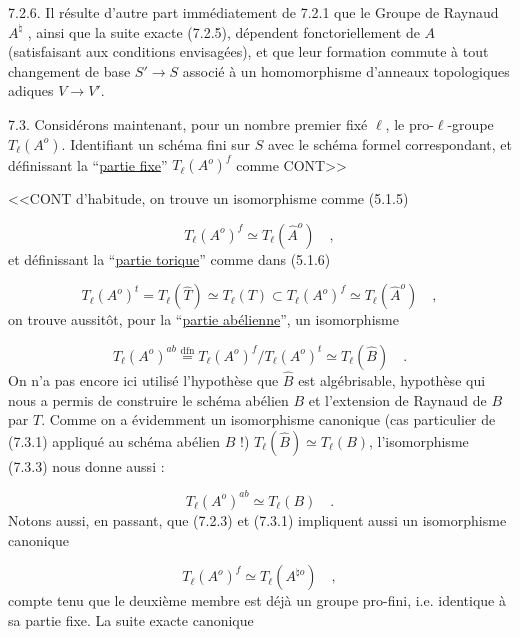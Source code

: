 7.2.6. Il résulte d'autre part immédiatement de 7.2.1 que le Groupe de Raynaud $A^{\natural}$ , ainsi que la suite exacte (7.2.5), dépendent fonctoriellement de $A$ (satisfaisant aux conditions envisagées), et que leur formation commute à tout changement de base $S' \longrightarrow S$ associé à un homomorphisme d'anneaux topologiques adiques $V \longrightarrow V'$.

7.3. Considérons maintenant, pour un nombre premier fixé $\ell$, le pro-$\ell$-groupe $T_{\ell}(A^{o})$. Identifiant un schéma fini sur $S$ avec le schéma formel correspondant, et définissant la ``\underline{partie fixe}'' $T_{\ell}(A^{o})^{f}$ comme CONT>>



<<CONT d'habitude, on trouve un isomorphisme comme (5.1.5)

\begin{equation}\tag{7.3.1}
T_{\ell}(A^{o})^{f} \simeq T_{\ell}(\hat{A}^{o}) \quad ,
\end{equation}
et définissant la ``\underline{partie torique}'' comme dans (5.1.6)

\begin{equation}\tag{7.3.2}
T_{\ell}(A^{o})^{t} = T_{\ell}(\hat{T}) \simeq T_{\ell}(T) \subset T_{\ell}(A^{o})^{f} \simeq T_{\ell}(\hat{A}^{o}) \quad ,
\end{equation}
on trouve aussitôt, pour la ``\underline{partie abélienne}'', un isomorphisme

\begin{equation}\tag{7.3.3}
T_{\ell}(A^{o})^{ab} \stackrel{\mathrm{dfn}}{=} T_{\ell}(A^{o})^{f}/T_{\ell}(A^{o})^{t} \simeq T_{\ell}(\hat{B}) \quad .
\end{equation}
On n'a pas encore ici utilisé l'hypothèse que $\hat{B}$ est algébrisable, hypothèse qui nous a permis de construire le schéma abélien $B$ et l'extension de Raynaud de $B$ par $T$. Comme on a évidemment un isomorphisme canonique (cas particulier de (7.3.1) appliqué au schéma abélien $B$ !) $T_{\ell}(\hat{B}) \simeq T_{\ell}(B)$, l'isomorphisme (7.3.3) nous donne aussi :

\begin{equation}\tag{7.3.4}
T_{\ell}(A^{o})^{ab} \simeq T_{\ell}(B) \quad .
\end{equation}
Notons aussi, en passant, que (7.2.3) et (7.3.1) impliquent aussi un isomorphisme canonique

\begin{equation}\tag{7.3.5}
T_{\ell}(A^{o})^{f} \simeq T_{\ell}(A^{\natural o}) \quad ,
\end{equation}
compte tenu que le deuxième membre est déjà un groupe pro-fini, i.e. identique à sa partie fixe. La suite exacte canonique

